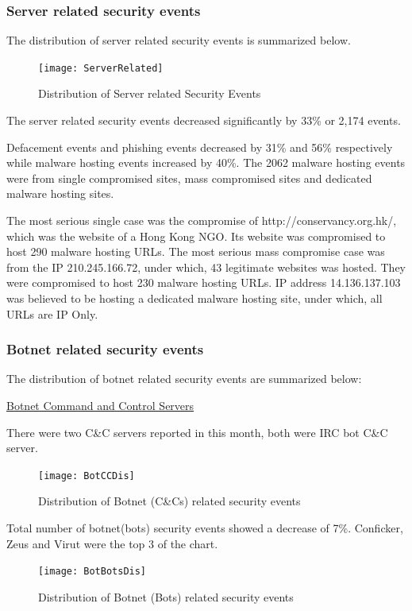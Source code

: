 \documentclass[11pt]{article}
\begin{document}
\subsubsection*{Server related security events}
The distribution of server related security events is summarized below.

\begin{figure}[h!]
\centerline{\texttt{[image: ServerRelated]}}
\caption{Distribution of Server related Security Events}
\end{figure}

The server related security events decreased significantly by 33\% or 2,174 events.

Defacement events and phishing events decreased by 31\% and 56\% respectively while malware hosting events increased by 40\%.
The 2062 malware hosting events were from single compromised sites, mass compromised sites and dedicated malware hosting sites.

The most serious single case was the compromise of http://conservancy.org.hk/, which was the website of a Hong Kong NGO. Its website was compromised to host 290 malware hosting URLs. The most serious mass compromise case was from the IP 210.245.166.72, under which, 43 legitimate websites was hosted. They were compromised to host 230 malware hosting URLs. IP address 14.136.137.103 was believed to be hosting a dedicated malware hosting site, under which, all URLs are IP Only.


\subsubsection*{Botnet related security events}
The distribution of botnet related security events are summarized below:

\underline{Botnet Command and Control Servers}

There were two C\&C servers reported in this month, both were IRC bot C\&C server.

\begin{figure}[h!]
\centerline{\texttt{[image: BotCCDis]}}
\caption{Distribution of Botnet (C\&Cs) related security events}
\end{figure}

Total number of botnet(bots) security events showed a decrease of 7\%. Conficker, Zeus and Virut were the top 3 of the chart.

\begin{figure}[h!]
\centerline{\texttt{[image: BotBotsDis]}}
\caption{Distribution of Botnet (Bots) related security events}
\end{figure}
\end{document}
